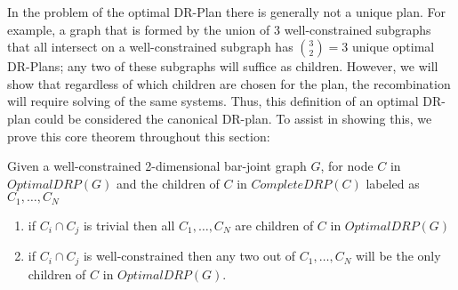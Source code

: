In the problem of the optimal DR-Plan there is generally not a unique plan. For example, a graph that is formed by the union of 3 well-constrained subgraphs that all intersect on a well-constrained subgraph has ${3\choose 2} = 3$ unique optimal DR-Plans; any two of these subgraphs will suffice as children.
However, we will show that regardless of which children are chosen for the plan, the recombination will require solving of the same systems. Thus, this definition of an optimal DR-plan could be considered the canonical DR-plan. To assist in showing this, we prove this core theorem throughout this section:


\begin{theorem}\label{t1}
Given a well-constrained 2-dimensional bar-joint graph $G$, for node $C$ in $OptimalDRP(G)$ and the children of $C$ in $CompleteDRP(C)$ labeled as $C_1,\ldots,C_N$
\begin{enumerate}
    \item if $C_i \cap C_j$ is trivial then all $C_1,\ldots,C_N$ are children of $C$ in $OptimalDRP(G)$
    \item if $C_i \cap C_j$ is well-constrained then any two out of $C_1,\ldots,C_N$ will be the only children of $C$ in $OptimalDRP(G)$.
\end{enumerate}
\end{theorem}







